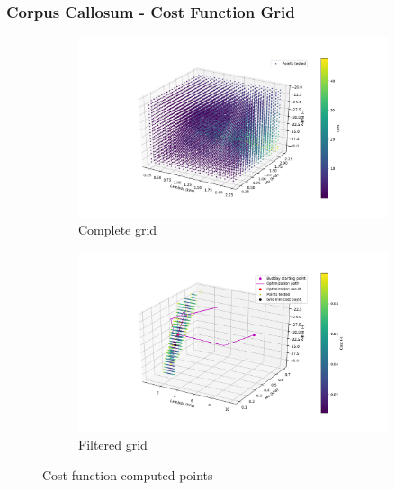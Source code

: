 \documentclass{beamer}
\begin{document}
\begin{frame}
\frametitle{Corpus Callosum - Cost Function Grid}
\begin{figure}[h!]
\centering
\begin{subfigure}[t]{0.5\linewidth}
\centering
\includegraphics[width = 1.\linewidth, trim = 80 50 50 50]
{Pictures/CorpusCallosumCompleteGrid}
\caption{Complete grid}
\end{subfigure}%
\begin{subfigure}[t]{0.5\linewidth}
\centering
\includegraphics[width = 1.\textwidth, trim = 50 50 80 50]
{Pictures/CorpusCallosumFilteredGrid}
\caption{Filtered grid}
\end{subfigure}
\caption{Cost function computed points}
\end{figure}
\end{frame}
\end{document}
